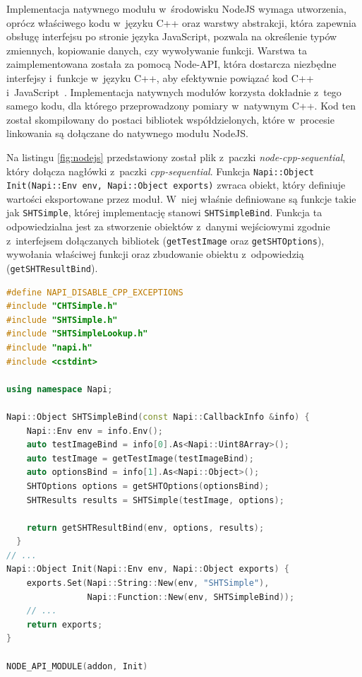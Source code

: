 Implementacja natywnego modułu w~środowisku NodeJS wymaga utworzenia, oprócz właściwego kodu w~języku C++ oraz warstwy abstrakcji, która zapewnia obsługę interfejsu po stronie języka JavaScript, pozwala na określenie typów zmiennych, kopiowanie danych, czy wywoływanie funkcji. Warstwa ta zaimplementowana została za pomocą Node-API, która dostarcza niezbędne interfejsy i~funkcje w~języku C++, aby efektywnie powiązać kod C++ i~JavaScript~\cite{napi}. Implementacja natywnych modułów korzysta dokładnie z~tego samego kodu, dla którego przeprowadzony pomiary w~natywnym C++. Kod ten został skompilowany do postaci bibliotek współdzielonych, które w~procesie linkowania są dołączane do natywnego modułu NodeJS. 

Na listingu \ref{fig:nodejs} przedstawiony został plik z~paczki \textit{node-cpp-sequential}, który dołącza nagłówki z~paczki \textit{cpp-sequential}. Funkcja \lstinline{Napi::Object Init(Napi::Env env, Napi::Object exports)} zwraca obiekt, który definiuje wartości eksportowane przez moduł. W~niej właśnie definiowane są funkcje takie jak \lstinline{SHTSimple}, której implementację stanowi \lstinline{SHTSimpleBind}. Funkcja ta odpowiedzialna jest za stworzenie obiektów z~danymi wejściowymi zgodnie z~interfejsem dołączanych bibliotek (\lstinline{getTestImage} oraz \lstinline{getSHTOptions}), wywołania właściwej funkcji oraz zbudowanie obiektu z~odpowiedzią (\lstinline{getSHTResultBind}).

\begin{lstlisting}[language=C++, float=h, caption=Plik powiązania kodu C++ z~JavaScript, label=lst:cpp-js]
#define NAPI_DISABLE_CPP_EXCEPTIONS
#include "CHTSimple.h"
#include "SHTSimple.h"
#include "SHTSimpleLookup.h"
#include "napi.h"
#include <cstdint>

using namespace Napi;
    
Napi::Object SHTSimpleBind(const Napi::CallbackInfo &info) {
    Napi::Env env = info.Env();
    auto testImageBind = info[0].As<Napi::Uint8Array>();
    auto testImage = getTestImage(testImageBind);
    auto optionsBind = info[1].As<Napi::Object>();
    SHTOptions options = getSHTOptions(optionsBind);
    SHTResults results = SHTSimple(testImage, options);
  
    return getSHTResultBind(env, options, results);
  }
// ...
Napi::Object Init(Napi::Env env, Napi::Object exports) {
    exports.Set(Napi::String::New(env, "SHTSimple"),
                Napi::Function::New(env, SHTSimpleBind));
    // ...
    return exports;
}
  
NODE_API_MODULE(addon, Init)
\end{lstlisting}

